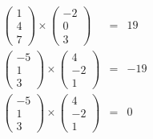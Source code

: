 \documentclass[a4paper]{article}
\begin{document}
\subsection{}
  \begin{align*}
    \begin{pmatrix}
      1 \\ 4 \\ 7
    \end{pmatrix}
    \times
    \begin{pmatrix}
      -2 \\ 0 \\ 3
    \end{pmatrix}
    &=& 19
    \\[1em]
    \begin{pmatrix}
      -5 \\ 1 \\ 3
    \end{pmatrix}
    \times
    \begin{pmatrix}
      4 \\ -2 \\ 1
    \end{pmatrix}
    &=& -19
    \\[1em]
    \begin{pmatrix}
      -5 \\ 1 \\ 3
    \end{pmatrix}
    \times
    \begin{pmatrix}
      4 \\ -2 \\ 1
    \end{pmatrix}
    &=& 0
  \end{align*}
\end{document}
